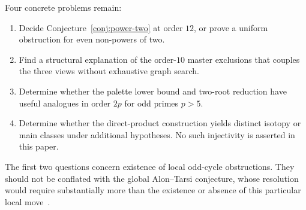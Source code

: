 Four concrete problems remain:
\begin{enumerate}
\item Decide Conjecture~\ref{conj:power-two} at order $12$, or prove a uniform
obstruction for even non-powers of two.
\item Find a structural explanation of the order-$10$ master exclusions that
couples the three views without exhaustive graph search.
\item Determine whether the palette lower bound and two-root reduction have
useful analogues in order $2p$ for odd primes $p>5$.
\item Determine whether the direct-product construction yields distinct
isotopy or main classes under additional hypotheses.  No such injectivity is
asserted in this paper.
\end{enumerate}

The first two questions concern existence of local odd-cycle obstructions.
They should not be conflated with the global Alon--Tarsi conjecture, whose
resolution would require substantially more than the existence or absence of
this particular local move~\cite{AlonTarsi1992}.

